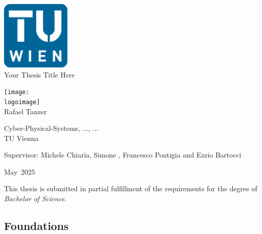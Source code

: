 \documentclass[11pt]{report}
\newcommand{\thesistitle}{Your Thesis Title Here}
\newcommand{\authorname}{Rafael Tanzer}
\newcommand{\supervisor}{Michele Chiaria, Simone , Francesco Pontigia and Ezzio Bartocci}
\newcommand{\institution}{TU Vienna}
\newcommand{\department}{Cyber-Physical-Systems, ..., ...}
\newcommand{\logoimage}{graphics/logo.png} %
\newcommand{\submissionmonth}{May}
\newcommand{\submissionyear}{2025}
\begin{document}
\begin{titlepage}
  \centering
  \vspace*{1cm}

  \includegraphics[width=0.25\textwidth]{graphics/tuWienLogo.png}
  \\[1cm]

  {\Huge \thesistitle\\[1.5cm]}

  \texttt{[image: \\logoimage]}\\[1cm]

  {\Large \authorname\\[0.5cm]}

  {\large \department\\
  \institution\\[1.5cm]}

  {\large Supervisor: \supervisor\\[2cm]}

  {\large \submissionmonth~\submissionyear\\}

  \vfill

  \vspace*{0.5cm}
  {\small This thesis is submitted in partial fulfillment of the requirements for the degree of \textit{Bachelor of Science}.}

\end{titlepage}


\begin{abstract}
\end{abstract}

\tableofcontents


\begin{refsection}
  \part{Foundations}
  
\end{refsection}
\end{document}
